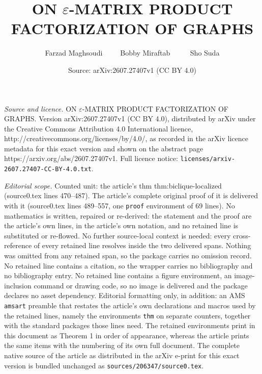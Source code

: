 \documentclass[10pt,a4paper]{amsart}
\title{\MakeUppercase{On {\Large{$\varepsilon$}}-Matrix Product Factorization of graphs}}
\author{Farzad Maghsoudi\, \, \, \, \, Bobby Miraftab \, \, \, \, \, Sho Suda}
\date{Source: arXiv:2607.27407v1 (CC BY 4.0)}
\begin{document}
\maketitle

\noindent\emph{Source and licence.} \MakeUppercase{On {\Large{$\varepsilon$}}-Matrix Product Factorization of graphs}. Version arXiv:2607.27407v1 (CC BY 4.0), distributed by arXiv under the Creative Commons Attribution 4.0 International licence, http://creativecommons.org/licenses/by/4.0/, as recorded in the arXiv licence metadata for this exact version and shown on the abstract page https://arxiv.org/abs/2607.27407v1. Full licence notice: \texttt{licenses/arxiv-2607.27407-CC-BY-4.0.txt}.\par\smallskip

\noindent\textit{Editorial scope.} Counted unit: the article's thm thm:biclique-localized (source0.tex lines 470--487). The article's complete original proof of it is delivered with it (source0.tex lines 489--557, one \texttt{proof} environment of 69 lines). No mathematics is written, repaired or re-derived: the statement and the proof are the article's own lines, in the article's own notation, and no retained line is substituted or re-flowed.  No further source-local context is needed: every cross-reference of every retained line resolves inside the two delivered spans.  Nothing was omitted from any retained span, so the package carries no omission record.  No retained line contains a citation, so the wrapper carries no bibliography and no bibliography entry.  No retained line contains a figure environment, an image-inclusion command or drawing code, so no image is delivered and the package declares no asset dependency.  Editorial formatting only, in addition: an AMS \texttt{amsart} preamble that restates the article's own declarations and macros used by the retained lines, namely the environments \texttt{thm} on separate counters, together with the standard packages those lines need.  The retained environments print in this document as Theorem 1 in order of appearance, whereas the article prints the same items with the numbering of its own full document.  The complete native source of the article as distributed in the arXiv e-print for this exact version is bundled unchanged as \texttt{sources/206347/source0.tex}.
\end{document}
